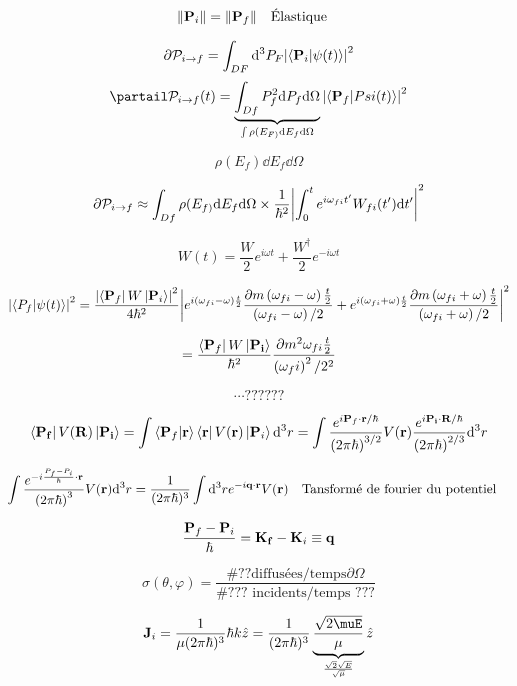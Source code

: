 $$\norm{\vb{P}_i} = \norm{\vb{P}_f} \qq{Élastique}$$ 

$$\partial \mathcal{P}_{i\to f} = \int_{DF}  \dd^3 P_F \abs{\bra{\vb{P}_i}\ket{\psi(t)}}^2 $$ 
$$\partail \mathcal{P}_{i \to f} (t)  =\underbrace{\int_{Df} P_f^2 \dd P_f \dd \Omega}_{\int \rho(E_{F)} \dd E_f \dd \Omega}  \abs{\bra{\vb{P}_f}\ket{Psi(t)}}^2$$ 

$$\boxed{\rho(E_f ) \dd E_f \dd\Omega}$$ 



$$\partial \mathcal{P}_{i\to f} \approx \int_{Df} \rho(E_{f)} \dd E_f \dd \Omega \times  \frac{1}{\hbar^2} \abs{\int_0^t e^{i\omega_{fi} t'} W_{fi} (t') \dd t'}^2$$ 

$$W(t) = \frac{W}{2} e^{i\omega t} + \frac{W^\dagger}{2} e^{-i\omega t}$$ 



$$\abs{\bra{P_{f}} \ket{\psi(t)}}^2 = \frac{\abs{\bra{\vb{P}_f}W\ket{\vb{P}_i}}^2}{4\hbar^2} \abs{e^{i\left( \omega_{fi} -\omega \right) \frac{t}{2} } \frac{\partial m \left( \omega_{fi} -\omega \right) \frac{t}{2}  }{\left( \omega_{fi} -\omega \right)/2} +e^{i \left( \omega_{fi} + \omega \right)\frac{t}{2} } \frac{\partial m \left( \omega_{fi} + \omega \right) \frac{t}{2} }{\left( \omega_{fi} + \omega \right)/2}  }^2$$ 


$$= \frac{\bra{\vb{P}_f}W \ket{\vb{P_i}}}{\hbar^2} \frac{\partial m^2 \omega_{fi} \frac{t}{2} }{\left( \omega_fi \right)^2/2^2}  $$ 


$$\dotsb??????$$ 


$$\bra{\vb{P_{f}}} V(\vb{R}) \ket{\vb{P_{i}}} = \int \bra{\vb{P}_f}\ket{\vb{r}}\bra{\vb{r}}V(\vb{r}) \ket{\vb{P}_i} \dd^3 r = \int \frac{e^{i \vb{P}_f \cdot \vb{r} /\hbar}}{\left( 2\pi\hbar \right)^{3/2}} V(\vb{r}) \frac{e^{i \vb{P_i \cdot \vb{R}}/\hbar}}{\left( 2\pi\hbar \right)^{2/3}} \dd^3 r    $$ 


$$\int \frac{e^{-i \frac{P_f - P_i}{\hbar} \cdot \vb{r}}}{\left( 2\pi \hbar \right)^3} V(\vb{r}) \dd^3 r = \frac{1}{(2\pi\hbar)^3} \int \dd^3 r e^{-i \vb{q} \cdot \vb{r}} V( \vb{r}) \qq{Tansformé de fourier du potentiel} $$ 

$$\frac{\vb{P}_f-\vb{P}_i}{\hbar} = \vb{K_{f}}- \vb{K}_i \equiv \vb{q}$$ 

$$\sigma(\theta, \varphi) = \frac{\# ?? \text{diffusées/temps}  \partial\Omega }{\# \text{??? incidents/temps ???} } $$ 


$$\vb{J}_i = \frac{1}{\mu(2\pi\hbar)^3} \hbar k \hat z = \frac{1}{(2\pi\hbar)^3} \underbrace{\frac{\sqrt{2\muE}}{\mu}}_{\frac{\sqrt{2}\sqrt{E}}{\sqrt{\mu}} }  \hat z$$ 

